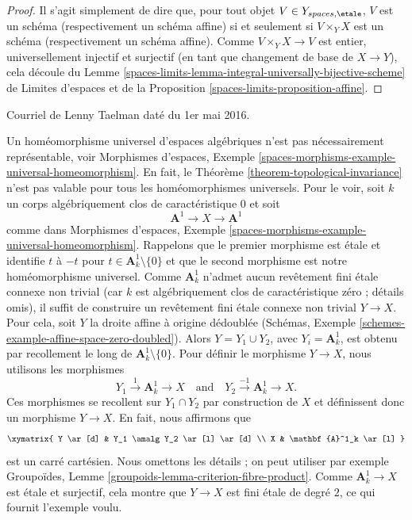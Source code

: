 \begin{proof}
Il s'agit simplement de dire que, pour tout objet
$V \in Y_{spaces, \etale}$, $V$ est un schéma (respectivement un schéma affine) si et
seulement si $V \times_Y X$ est un schéma (respectivement un schéma affine). Comme $V \times_Y X \to V$
est entier, universellement injectif et surjectif (en tant que changement
de base de $X \to Y$), cela
découle du Lemme
\ref{spaces-limits-lemma-integral-universally-bijective-scheme} de Limites d'espaces et de la
Proposition \ref{spaces-limits-proposition-affine}.
\end{proof}

\begin{remark}
\label{remark-topological-invariance-etale-site}
\begin{reference}
Courriel de Lenny Taelman daté du 1er mai 2016.
\end{reference}
Un homéomorphisme universel d'espaces algébriques n'est pas nécessairement représentable, voir
Morphismes d'espaces,
Exemple \ref{spaces-morphisms-example-universal-homeomorphism}.
En fait, le Théorème \ref{theorem-topological-invariance} n'est
pas valable pour tous les homéomorphismes universels. Pour le voir, soit $k$ un
corps algébriquement clos de caractéristique $0$ et soit
$$
\mathbf{A}^1 \to X \to \mathbf{A}^1
$$
comme dans Morphismes d'espaces,
Exemple \ref{spaces-morphisms-example-universal-homeomorphism}.
Rappelons que le premier morphisme est étale et identifie
$t$ à $-t$ pour $t \in \mathbf{A}^1_k \setminus \{0\}$
et que le second morphisme est notre homéomorphisme universel.
Comme $\mathbf{A}^1_k$ n'admet aucun
revêtement fini étale connexe non trivial
(car $k$ est algébriquement clos de caractéristique zéro ; détails omis),
il suffit de construire un revêtement fini étale connexe non trivial
$Y \to X$. Pour cela, soit $Y$ la droite affine
à origine dédoublée
(Schémas, Exemple \ref{schemes-example-affine-space-zero-doubled}).
Alors $Y = Y_1 \cup Y_2$, avec $Y_i = \mathbf{A}^1_k$, est obtenu par recollement
le long de $\mathbf{A}^1_k \setminus \{0\}$.
Pour définir le morphisme $Y \to X$, nous utilisons les morphismes
$$
Y_1 \xrightarrow{1} \mathbf{A}^1_k \to X
\quad\text{and}\quad
Y_2 \xrightarrow{-1} \mathbf{A}^1_k \to X.
$$
Ces morphismes se recollent sur $Y_1 \cap Y_2$ par construction de $X$ et
définissent donc un morphisme $Y \to X$. En fait, nous affirmons que
$$
\xymatrix{
Y \ar[d] & Y_1 \amalg Y_2 \ar[l] \ar[d] \\
X & \mathbf{A}^1_k \ar[l]
}
$$
est un carré cartésien. Nous omettons les détails ; on peut utiliser par exemple
Groupoïdes, Lemme \ref{groupoids-lemma-criterion-fibre-product}.
Comme $\mathbf{A}^1_k \to X$ est étale et
surjectif, cela montre que $Y \to X$
est fini étale de degré $2$, ce qui fournit l'exemple voulu.


\end{remark}
